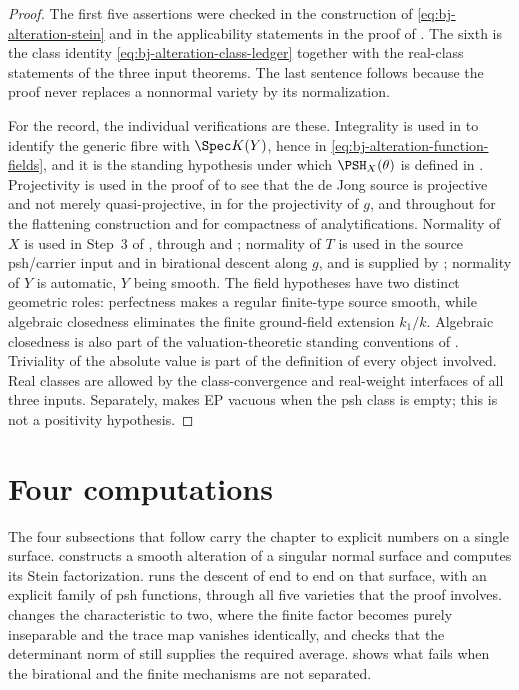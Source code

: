 \begin{proof}
The first five assertions were checked in the construction of
\eqref{eq:bj-alteration-stein} and in the applicability statements in the
proof of .
The sixth is the class identity
\eqref{eq:bj-alteration-class-ledger} together with the real-class statements
of the three input theorems.
The last sentence follows because the proof never replaces a nonnormal
variety by its normalization.

For the record, the individual verifications are these.  Integrality is used
in  to identify the generic fibre with
$\Spec K(Y)$, hence in \eqref{eq:bj-alteration-function-fields}, and it is
the standing hypothesis under which $\PSH_X(\theta)$ is defined in
.  Projectivity is used in the proof of
 to see that the de Jong source is projective and
not merely quasi-projective, in  for the
projectivity of $g$, and throughout  for the
flattening construction and for compactness of analytifications.
Normality of $X$ is used in Step~3 of
, through
 and
; normality of $T$ is used in the source psh/carrier input and in
birational descent along $g$, and is supplied by
\cite[\href{https://stacks.math.columbia.edu/tag/035L}{Tag 035L}]
{stacks-project}; normality of $Y$ is automatic, $Y$ being smooth.
The field hypotheses have two distinct geometric roles: perfectness makes a
regular finite-type source smooth, while algebraic closedness eliminates the
finite ground-field extension $k_1/k$.  Algebraic closedness is also part of
the valuation-theoretic standing conventions of .  Triviality
of the absolute value is
part of the definition of every object involved.  Real classes are allowed by the class-convergence and real-weight
interfaces of all three inputs.  Separately,
 makes EP vacuous when the psh class
is empty; this is not a positivity hypothesis.
\end{proof}

\section{Four computations}
\label{sec:ch42-examples}

The four subsections that follow carry the chapter to explicit numbers on a
single surface.   constructs a smooth
alteration of a singular normal surface and computes its Stein
factorization.   runs the descent of
 end to end on that surface, with an
explicit family of psh functions, through all five varieties that the proof
involves.   changes the characteristic to two,
where the finite factor becomes purely inseparable and the trace map
vanishes identically, and checks that the determinant norm of
 still supplies the required average.   shows what fails when the
birational and the finite mechanisms are not separated.

